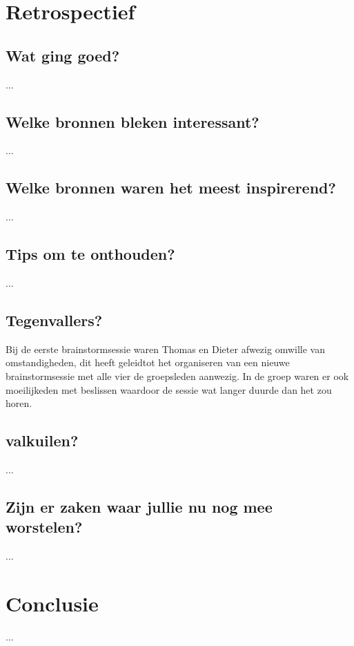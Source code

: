 \documentclass[fleqn,10pt]{voorstel}
\begin{document}
\section{Retrospectief}
\subsection{Wat ging goed?}
...
\subsection{Welke bronnen bleken interessant?}
...
\subsection{Welke bronnen waren het meest inspirerend?}
...
\subsection{Tips om te onthouden?}
...
\subsection{Tegenvallers?}
Bij de eerste brainstormsessie waren Thomas en Dieter afwezig omwille van omstandigheden, dit heeft geleidtot het organiseren van een nieuwe brainstormsessie met alle vier de groepsleden aanwezig. In de groep waren er ook
moeilijkeden met beslissen waardoor de sessie wat langer duurde dan het zou horen.
\subsection{valkuilen?}
...
\subsection{Zijn er zaken waar jullie nu nog mee worstelen?}
...

\section{Conclusie}
...




\end{document}
